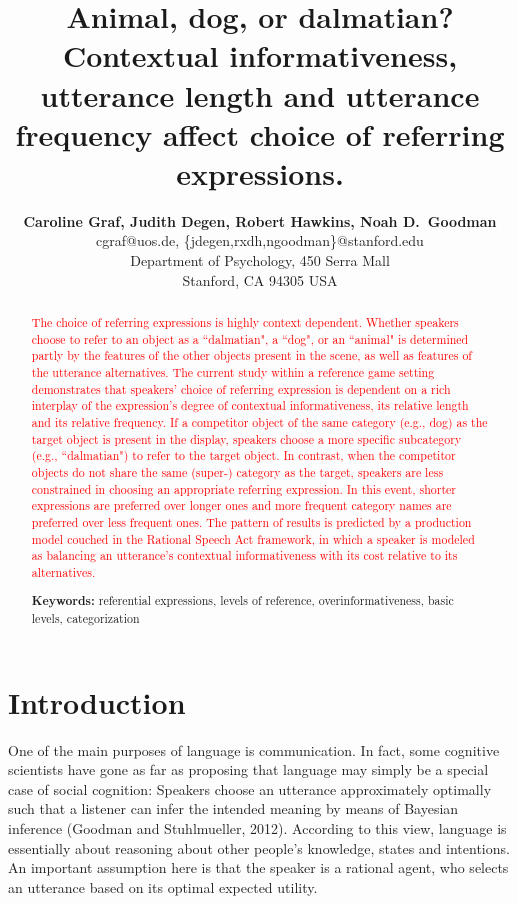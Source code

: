 \documentclass[10pt,letterpaper]{article}
\title{Animal, dog, or dalmatian? Contextual informativeness, utterance length and utterance frequency affect choice of referring expressions.}
\author{{\large \bf Caroline Graf, Judith Degen, Robert Hawkins, Noah D.~Goodman} \\
  cgraf@uos.de, \{jdegen,rxdh,ngoodman\}@stanford.edu\\
  Department of Psychology, 450 Serra Mall \\
  Stanford, CA 94305 USA}
\newcommand{\red}[1]{\textcolor{Red}{#1}}
\begin{document}
\maketitle


\begin{abstract}

\red{The choice of referring expressions is highly context dependent. Whether speakers choose to refer to an object as a “dalmatian", a “dog", or an “animal" is determined partly by the features of the other objects present in the scene, as well as features of the utterance alternatives. The current study within a reference game setting demonstrates that speakers' choice of referring expression is dependent on a rich interplay of the expression's degree of contextual informativeness, its relative length and its relative frequency. If a competitor object of the same category (e.g., dog) as the target object is present in the display, speakers choose a more specific subcategory (e.g., “dalmatian") to refer to the target object. In contrast, when the competitor objects do not share the same (super-) category as the target, speakers are less constrained in choosing an appropriate referring expression. In this event, shorter expressions are preferred over longer ones and more frequent category names are preferred over less frequent ones. The pattern of results is predicted by a production model couched in the Rational Speech Act framework, in which a speaker is modeled as balancing an utterance's contextual informativeness with its cost relative to its alternatives.}

\textbf{Keywords:} 
referential expressions, levels of reference, overinformativeness, basic levels, categorization
\end{abstract}

\section{\bf Introduction}
One of the main purposes of language is communication. In fact, some cognitive scientists have gone as far as proposing that language may simply be a special case of social cognition: Speakers choose an utterance approximately optimally such that a listener can infer the intended meaning by means of Bayesian inference (Goodman and Stuhlmueller, 2012). According to this view, language is essentially about reasoning about other people's knowledge, states and intentions. An important assumption here is that the speaker is a rational agent, who selects an utterance based on its optimal expected utility. 
\end{document}
